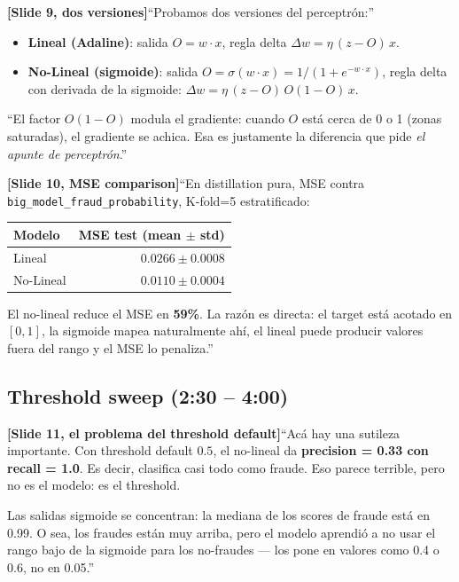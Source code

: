 \documentclass[11pt,a4paper]{article}
\newcommand{\code}[1]{\texttt{\textcolor{accent}{#1}}}
\newcommand{\slidenum}[1]{\textcolor{accent}{\textbf{[Slide #1]}}}
\newcommand{\timing}[1]{\textcolor{muted}{\small (#1)}}
\newcommand{\enunciado}[1]{\textcolor{warn}{\textit{#1}}}
\begin{document}
\slidenum{9, dos versiones}\quad ``Probamos dos versiones del perceptrón:''

\begin{itemize}[leftmargin=1.4em, itemsep=2pt]
  \item \textbf{Lineal (Adaline)}: salida $O = w \cdot x$, regla delta $\Delta w = \eta\,(z - O)\,x$.
  \item \textbf{No-Lineal (sigmoide)}: salida $O = \sigma(w \cdot x) = 1/(1 + e^{-w\cdot x})$, regla delta con derivada de la sigmoide: $\Delta w = \eta\,(z - O)\,O(1-O)\,x$.
\end{itemize}

``El factor $O(1-O)$ modula el gradiente: cuando $O$ está cerca de 0 o 1 (zonas saturadas), el gradiente se achica. Esa es justamente la diferencia que pide \enunciado{el apunte de perceptrón}.''

\slidenum{10, MSE comparison}\quad ``En distillation pura, MSE contra \code{big\_model\_fraud\_probability}, K-fold=5 estratificado:

\begin{center}
\begin{tabular}{@{}lr@{}}
\toprule
Modelo & MSE test (mean $\pm$ std) \\
\midrule
Lineal     & $0.0266 \pm 0.0008$ \\
No-Lineal  & $\boldsymbol{0.0110 \pm 0.0004}$ \\
\bottomrule
\end{tabular}
\end{center}

El no-lineal reduce el MSE en \textbf{59\%}. La razón es directa: el target está acotado en $[0,1]$, la sigmoide mapea naturalmente ahí, el lineal puede producir valores fuera del rango y el MSE lo penaliza.''

\subsection{Threshold sweep \timing{2:30 -- 4:00}}

\slidenum{11, el problema del threshold default}\quad ``Acá hay una sutileza importante. Con threshold default $0.5$, el no-lineal da \textbf{precision = 0.33 con recall = 1.0}. Es decir, clasifica casi todo como fraude. Eso parece terrible, pero no es el modelo: es el threshold.

Las salidas sigmoide se concentran: la mediana de los scores de fraude está en 0.99. O sea, los fraudes están muy arriba, pero el modelo aprendió a no usar el rango bajo de la sigmoide para los no-fraudes --- los pone en valores como 0.4 o 0.6, no en 0.05.''
\end{document}
